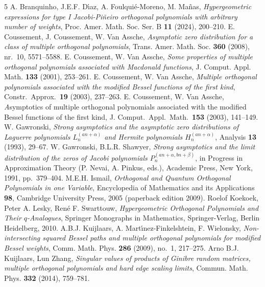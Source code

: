 \documentclass[12pt]{article}
\numberwithin{equation}{section}
\begin{document}
\begin{thebibliography}{5}
 A. Branquinho, J.E.F. D\'\i az, A. Foulqui\'e-Moreno, M. Ma\~nas, 
\textit{Hypergeometric expressions for type I Jacobi-Pi\~neiro orthogonal polynomials with arbitrary number of weights}, 
Proc. Amer. Math. Soc. Ser. B \textbf{11} (2024), 200--210.
 E. Coussement, J. Coussement, W. Van Assche,
\textit{Asymptotic zero distribution for a class of multiple orthogonal polynomials},
Trans. Amer. Math. Soc. \textbf{360} (2008), nr.~10, 5571--5588.
 E. Coussement, W. Van Assche,
\textit{Some properties of multiple orthogonal polynomials associated with Macdonald functions},
J. Comput. Appl. Math. \textbf{133} (2001), 253--261.
 E. Coussement, W. Van Assche,
\textit{Multiple orthogonal polynomials associated with the modified Bessel functions of the first kind},
Constr.\ Approx.\ {\bf 19} (2003), 237--263.
 E. Coussement, W. Van Assche,
{\textit Asymptotics of multiple orthogonal polynomials associated with the modified Bessel functions of the first kind},
J. Comput.\ Appl.\ Math.\ {\bf 153} (2003), 141--149.
 W. Gawronski,
\textit{Strong asymptotics and the asymptotic zero distributions of Laguerre polynomials $L_n^{(an+\alpha)}$ and Hermite polynomials $H_n^{(an+\alpha)}$},
Analysis \textbf{13} (1993), 29--67.
 W. Gawronski, B.L.R. Shawyer,
\textit{Strong asymptotics and the limit distribution of the zeros of Jacobi polynomials $P_n^{(an+\alpha,bn+\beta)}$},
in Progress in Approximation Theory (P. Nevai, A. Pinkus, eds.), Academic Press, New York, 1991, pp.~379--404.
 M.E.H. Ismail,
\textit{Orthogonal and Quantum Orthogonal Polynomials in one Variable},
Encyclopedia of Mathematics and its Applications \textbf{98}, Cambridge University Press, 2005 (paperback edition 2009).
 Roelof Koekoek, Peter A. Lesky, Ren\'e F. Swarttouw,
\textit{Hypergeometric Orthogonal Polynomials and Their $q$-Analogues},
Springer Monographs in Mathematics, Springer-Verlag, Berlin Heidelberg, 2010.
 A.B.J. Kuijlaars, A. Mart\'\i nez-Finkelshtein, F. Wielonsky,
\textit{Non-intersecting squared Bessel paths and multiple orthogonal polynomials for modified Bessel weights},
Comm. Math. Phys. \textbf{286} (2009), no.~1, 217--275. 
 Arno B.J. Kuijlaars, Lun Zhang,
\textit{Singular values of products of Ginibre random matrices, multiple orthogonal polynomials and hard edge scaling limits},
Commun. Math. Phys. \textbf{332} (2014), 759--781.

\end{thebibliography}
\end{document}
